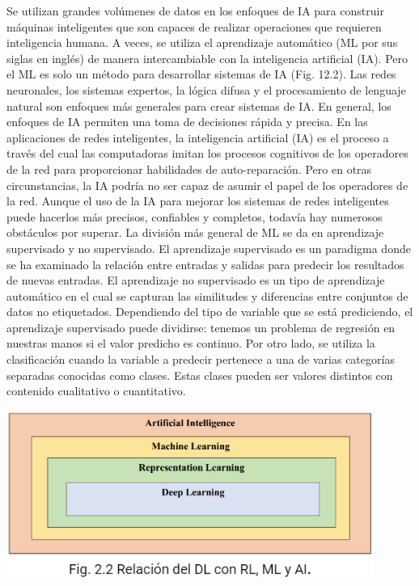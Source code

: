 \documentclass[crop=false]{standalone}
\begin{document}
Se utilizan grandes volúmenes de datos en los enfoques de IA para construir máquinas inteligentes que son capaces de realizar operaciones que requieren inteligencia humana. A veces, se utiliza el aprendizaje automático (ML por sus siglas en inglés) de manera intercambiable con la inteligencia artificial (IA). Pero el ML es solo un método para desarrollar sistemas de IA (Fig. 12.2). Las redes neuronales, los sistemas expertos, la lógica difusa y el procesamiento de lenguaje natural son enfoques más generales para crear sistemas de IA.
En general, los enfoques de IA permiten una toma de decisiones rápida y precisa. En las aplicaciones de redes inteligentes, la inteligencia artificial (IA) es el proceso a través del cual las computadoras imitan los procesos cognitivos de los operadores de la red para proporcionar habilidades de auto-reparación. Pero en otras circunstancias, la IA podría no ser capaz de asumir el papel de los operadores de la red. Aunque el uso de la IA para mejorar los sistemas de redes inteligentes puede hacerlos más precisos, confiables y completos, todavía hay numerosos obstáculos por superar.
La división más general de ML se da en aprendizaje supervisado y no supervisado. El aprendizaje supervisado es un paradigma donde se ha examinado la relación entre entradas y salidas para predecir los resultados de nuevas entradas. El aprendizaje no supervisado es un tipo de aprendizaje automático en el cual se capturan las similitudes y diferencias entre conjuntos de datos no etiquetados. Dependiendo del tipo de variable que se está prediciendo, el aprendizaje supervisado puede dividirse: tenemos un problema de regresión en nuestras manos si el valor predicho es continuo. Por otro lado, se utiliza la clasificación cuando la variable a predecir pertenece a una de varias categorías separadas conocidas como clases. Estas clases pueden ser valores distintos con contenido cualitativo o cuantitativo.

\begin{center}
\includegraphics[width=0.9\textwidth]{images/foto_texto_traducido_2.PNG}

\end{center}
\end{document}

